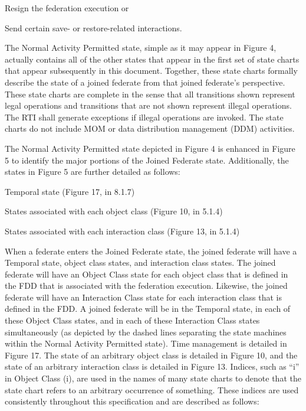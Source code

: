 \begin{stddashlist}
    \item Resign the federation execution or
    \item Send certain save- or restore-related interactions.
\end{stddashlist}

The Normal Activity Permitted state, simple as it may appear in Figure 4, actually contains all of the other states that appear in the first set of state charts that appear subsequently in this document. Together, these state charts formally describe the state of a joined federate from that joined federate's perspective. These state charts are complete in the sense that all transitions shown represent legal operations and transitions that are not shown represent illegal operations. The RTI shall generate exceptions if illegal operations are invoked. The state charts do not include MOM or data distribution management (DDM) activities.

The Normal Activity Permitted state depicted in Figure 4 is enhanced in Figure 5 to identify the major portions of the Joined Federate state. Additionally, the states in Figure 5 are further detailed as follows:

\begin{stddashlist}
    \item Temporal state (Figure 17, in 8.1.7)
    \item States associated with each object class (Figure 10, in 5.1.4)
    \item States associated with each interaction class (Figure 13, in 5.1.4)
\end{stddashlist}

When a federate enters the Joined Federate state, the joined federate will have a Temporal state, object class states, and interaction class states. The joined federate will have an Object Class state for each object class that is defined in the FDD that is associated with the federation execution. Likewise, the joined federate will have an Interaction Class state for each interaction class that is defined in the FDD. A joined federate will be in the Temporal state, in each of these Object Class states, and in each of these Interaction Class states simultaneously (as depicted by the dashed lines separating the state machines within the Normal Activity Permitted state). Time management is detailed in Figure 17. The state of an arbitrary object class is detailed in Figure 10, and the state of an arbitrary interaction class is detailed in Figure 13. Indices, such as ``i'' in Object Class (i), are used in the names of many state charts to denote that the state chart refers to an arbitrary occurrence of something. These indices are used consistently throughout this specification and are described as follows:

